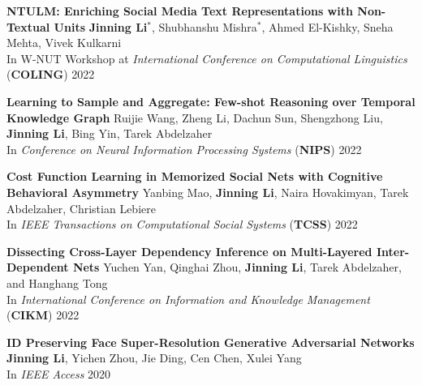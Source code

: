 \documentclass[12pt, letterpaper]{article}
\begin{document}
{\textbf{NTULM: Enriching Social Media Text Representations with Non-Textual Units}
\href{https://aclanthology.org/2022.wnut-1.7/}{}
\newline
\footnotesize
\textbf{Jinning Li}$^*$, Shubhanshu Mishra$^*$, Ahmed El-Kishky, Sneha Mehta, Vivek Kulkarni\\
In W-NUT Workshop at \emph{International Conference on
Computational Linguistics} (\textbf{COLING}) 2022
\small
\vspace{2pt}

\textbf{Learning to Sample and Aggregate: Few-shot Reasoning over Temporal Knowledge Graph}
\href{https://arxiv.org/abs/2210.08654}{}
\newline
\footnotesize
Ruijie Wang, Zheng Li, Dachun Sun, Shengzhong Liu, \textbf{Jinning Li}, Bing Yin, Tarek Abdelzaher\\
In \emph{Conference on Neural Information Processing Systems} (\textbf{NIPS}) 2022
\small
\vspace{2pt}

\textbf{Cost Function Learning in Memorized Social Nets with Cognitive Behavioral Asymmetry}
\href{https://ieeexplore.ieee.org/document/9945909}{}
\newline
\footnotesize
Yanbing Mao, \textbf{Jinning Li}, Naira Hovakimyan, Tarek Abdelzaher, Christian Lebiere\\
In \emph{IEEE Transactions on Computational Social Systems} (\textbf{TCSS}) 2022
\small
\vspace{2pt}

\textbf{Dissecting Cross-Layer Dependency Inference on Multi-Layered Inter-Dependent Nets}
\href{https://dl.acm.org/doi/abs/10.1145/3511808.3557291}{}
\newline
\footnotesize
Yuchen Yan, Qinghai Zhou, \textbf{Jinning Li}, Tarek Abdelzaher, and Hanghang Tong\\
In \emph{International Conference on Information and Knowledge Management} (\textbf{CIKM}) 2022
\small
\vspace{2pt}

\textbf{ID Preserving Face Super-Resolution Generative Adversarial Networks}
\href{https://ieeexplore.ieee.org/document/9146819}{}\href{https://github.com/jinningli/IP-FSRGAN}{}
\newline
\footnotesize
\textbf{Jinning Li}, Yichen Zhou, Jie Ding, Cen Chen, Xulei Yang\\
In \emph{IEEE Access} 2020
\small
\vspace{2pt}

}
\end{document}
